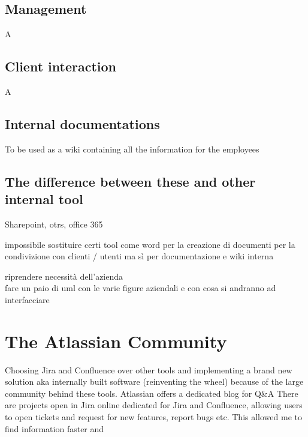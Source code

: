 	\subsection{Management} 
		A
	
	\subsection{Client interaction} 
		A
		
	\subsection{Internal documentations}
		To be used as a wiki containing all the information for the employees
		
	\subsection{The difference between these and other internal tool}
		Sharepoint, otrs, office 365
		
		impossibile sostituire certi tool come word per la creazione di documenti per la condivizione con clienti / utenti ma sì per documentazione e wiki interna


riprendere necessità dell'azienda\\
fare un paio di uml con le varie figure aziendali e con cosa si andranno ad interfacciare

\section{The Atlassian Community}
	Choosing Jira and Confluence over other tools and implementing a brand new solution aka internally built software (reinventing the wheel) 
	because of the large community behind these tools.
	Atlassian offers a dedicated blog for Q\&A
	There are projects open in Jira online dedicated for Jira and Confluence, allowing users to open tickets and request for new features, report bugs etc.
	This allowed me to find information faster and 
